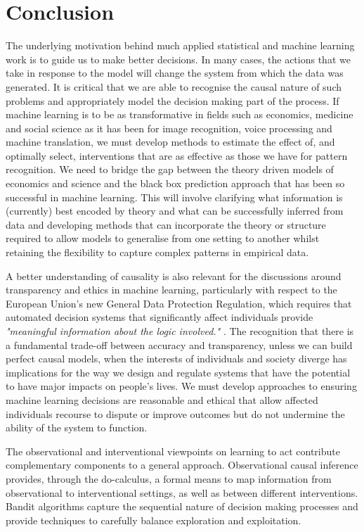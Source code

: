\documentclass[11pt,a4paper,twoside]{report}
\theoremstyle{plain}
\theoremstyle{definition}
\begin{document}
\chapter{Conclusion}

The underlying motivation behind much applied statistical and machine learning work is to guide us to make better decisions. In many cases, the actions that we take in response to the model will change the system from which the data was generated. It is critical that we are able to recognise the causal nature of such problems and appropriately model the decision making part of the process. If machine learning is to be as transformative in fields such as economics, medicine and social science as it has been for image recognition, voice processing and machine translation, we must develop methods to estimate the effect of, and optimally select, interventions that are as effective as those we have for pattern recognition. We need to bridge the gap between the theory driven models of economics and science and the black box prediction approach that has been so successful in machine learning. This will involve clarifying what information is (currently) best encoded by theory and what can be successfully inferred from data and developing methods that can incorporate the theory or structure required to allow models to generalise from one setting to another whilst retaining the flexibility to capture complex patterns in empirical data. 

A better understanding of causality is also relevant for the discussions around transparency and ethics in machine learning, particularly with respect to the European Union's new General Data Protection Regulation, which requires that automated decision systems that significantly affect individuals provide \textit{"meaningful information about the logic involved."} \cite{Goodman2016}. The recognition that there is a fundamental trade-off between accuracy and transparency, unless we can build perfect causal models, when the interests of individuals and society diverge has implications for the way we design and regulate systems that have the potential to have major impacts on people's lives. We must develop approaches to ensuring machine learning decisions are reasonable and ethical that allow affected individuals recourse to dispute or improve outcomes but do not undermine the ability of the system to function. 

The observational and interventional viewpoints on learning to act contribute complementary components to a general approach. Observational causal inference provides, through the do-calculus, a formal means to map information from observational to interventional settings, as well as between different interventions. Bandit algorithms capture the sequential nature of decision making processes and provide techniques to carefully balance exploration and exploitation. 
\end{document}
